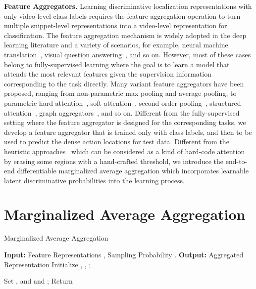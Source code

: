 \documentclass{article} \usepackage{iclr2019_conference,times}
\begin{document}
\textbf{Feature Aggregators.}
Learning discriminative localization representations with only video-level class labels requires the feature aggregation operation to turn multiple snippet-level representations into a video-level representation for classification. The feature aggregation mechanism is widely adopted in the deep learning literature and a variety of scenarios, for example, neural machine translation~\citep{machinetrans}, visual question answering~\citep{hermann2015teaching}, and so on. However, most of these cases belong to fully-supervised learning where the goal is to learn a model that attends the most relevant features given the supervision information corresponding to the task directly. Many variant feature aggregators have been proposed, ranging from non-parametric max pooling and average pooling, to parametric hard attention~\citep{gkioxari2015contextual}, soft attention~\citep{attention, sharma2015action}, second-order pooling~\citep{girdhar2017attentional, kong2017low}, structured attention~\citep{kim2017structured, mensch2018differentiableDP}, graph aggregators~\citep{zhang2018gaan, hamilton2017inductive}, and so on. Different from the fully-supervised setting where the feature aggregator is designed for the corresponding tasks, we develop a feature aggregator that is trained only with class labels, and then to be used to predict the dense action locations for test data. Different from the heuristic approaches~\citep{wei2017object, zhang2018adversarial} which can be considered as a kind of hard-code attention by erasing some regions with a hand-crafted threshold, we introduce the end-to-end differentiable marginalized average aggregation which incorporates learnable latent discriminative probabilities into the learning process.


\section{Marginalized Average Aggregation}\label{maa_algo}

\begin{algorithm}[h]
   \caption{Marginalized Average Aggregation}
   \label{MDA}
\begin{algorithmic}
   \STATE \textbf{Input:} Feature Representations   , Sampling Probability .
   \STATE \textbf{Output:} Aggregated Representation 
   \STATE Initialize , , ;
   
   \STATE Set  , and      and ;
   \STATE 
   \STATE      
   \ENDFOR
   \ENDFOR
   \STATE Return 
\end{algorithmic}

\end{algorithm}
\end{document}

